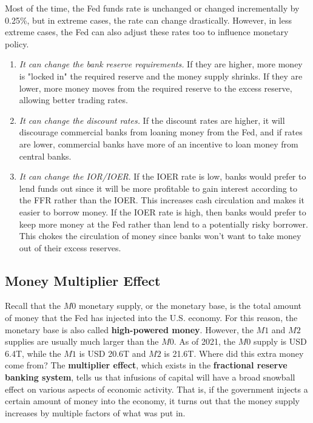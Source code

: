 \documentclass{article}
\begin{document}
    \begin{definition}
      Most of the time, the Fed funds rate is unchanged or changed incrementally by 0.25\%, but in extreme cases, the rate can change drastically. However, in less extreme cases, the Fed can also adjust these rates too to influence monetary policy. 
      \begin{enumerate}
        \item \textit{It can change the bank reserve requirements.} If they are higher, more money is "locked in" the required reserve and the money supply shrinks. If they are lower, more money moves from the required reserve to the excess reserve, allowing better trading rates. 
        \item \textit{It can change the discount rates.} If the discount rates are higher, it will discourage commercial banks from loaning money from the Fed, and if rates are lower, commercial banks have more of an incentive to loan money from central banks. 
        \item \textit{It can change the IOR/IOER}. If the IOER rate is low, banks would prefer to lend funds out since it will be more profitable to gain interest according to the FFR rather than the IOER. This increases cash circulation and makes it easier to borrow money. If the IOER rate is high, then banks would prefer to keep more money at the Fed rather than lend to a potentially risky borrower. This chokes the circulation of money since banks won't want to take money out of their excess reserves. 
      \end{enumerate}
    \end{definition}

  \subsection{Money Multiplier Effect}

    Recall that the $M0$ monetary supply, or the monetary base, is the total amount of money that the Fed has injected into the U.S. economy. For this reason, the monetary base is also called \textbf{high-powered money}. However, the $M1$ and $M2$ supplies are usually much larger than the $M0$. As of 2021, the $M0$ supply is USD 6.4T, while the $M1$ is USD 20.6T and $M2$ is 21.6T. Where did this extra money come from? The \textbf{multiplier effect}, which exists in the \textbf{fractional reserve banking system}, tells us that infusions of capital will have a broad snowball effect on various aspects of economic activity. That is, if the government injects a certain amount of money into the economy, it turns out that the money supply increases by multiple factors of what was put in.
\end{document}
